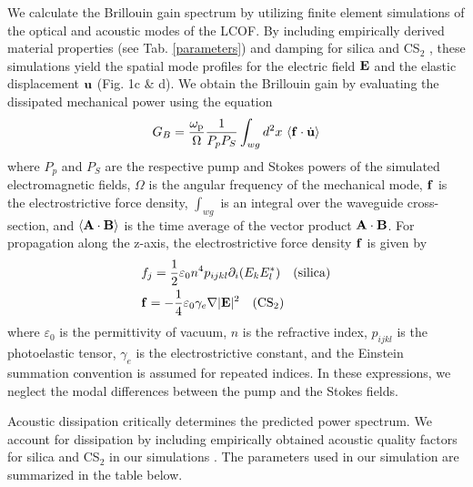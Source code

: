 We calculate the Brillouin gain spectrum by utilizing finite element simulations of the optical and acoustic modes of the \ac{LCOF}. By including empirically derived material properties (see Tab. \ref{parameters}) and damping for silica \cite{vacher1981ultrasonic} and CS$_2$ \cite{coakley1975brillouin}, these simulations yield the spatial mode profiles for the electric field ${\bf E}$ and the elastic displacement ${\bf u}$ (Fig. 1c \& d). We obtain the Brillouin gain by evaluating the dissipated mechanical power using the equation
\begin{equation}
G_{B} = \frac{\omega_{\rm p}}{\Omega} \frac{1}{P_p P_S} \int_{wg} d^2x \ \langle {\bf f} \cdot \dot{\bf u} \rangle
\end{equation}
where $P_p$ and $P_S$ are the respective pump and Stokes powers of the simulated electromagnetic fields, $\Omega$ is the angular frequency of the mechanical mode, ${\bf f}$ is the electrostrictive force density, $\int_{wg}$ is an integral over the waveguide cross-section, and  $\langle  {\bf A}\cdot {\bf B} \rangle$ is the time average of the vector product ${\bf A}\cdot {\bf B}$. For propagation along the z-axis,  the electrostrictive force density ${\bf f}$ is given by
\begin{align}
\label{ }
& f_j = \frac{1}{2} \varepsilon_0 n^4 p_{ijkl} \partial_i(E_k E_l^*)
\quad {\rm (silica)}
\\
& {\bf f} = - \frac{1}{4} \varepsilon_0 \gamma_e \nabla |{\bf E}|^2 \quad ({\rm CS}_2)
\end{align}
where $\varepsilon_0$ is the permittivity of vacuum, $n$ is the refractive index, $p_{ijkl}$ is the photoelastic tensor, $\gamma_e$ is the electrostrictive constant, and the Einstein summation convention is assumed for repeated indices. In these expressions, we neglect the modal differences between the pump and the Stokes fields.

Acoustic dissipation critically determines the predicted power spectrum. We account for dissipation by including empirically obtained acoustic quality factors for silica and CS$_2$ in our simulations \cite{coakley1975brillouin,vacher1981ultrasonic}. The parameters used in our simulation are summarized in the table below.

